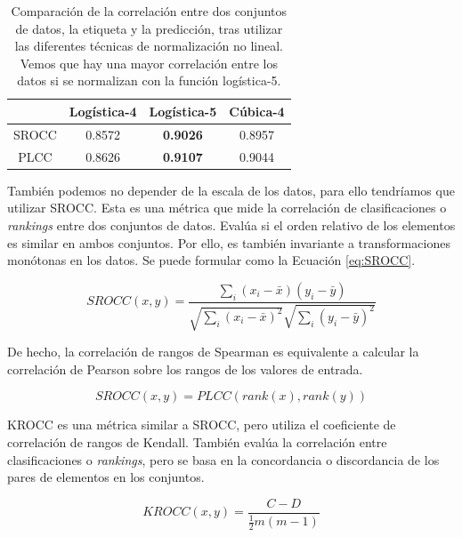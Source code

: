 \begin{table}[htp]
  \centering
  \scriptsize
  \begin{tabular}{|c|c|c|c|}
    \hline
    \rowcolor[HTML]{FFC702} 
    & \textbf{Logística-4} & \textbf{Logística-5} & \textbf{Cúbica-4} \\
    \hline 
    SROCC & 0.8572 & \textbf{0.9026} & 0.8957\\
    \hline
    PLCC & 0.8626 & \textbf{0.9107} & 0.9044 \\
    \hline 
  \end{tabular}
\caption[Comparativa entre funciones de normalización.]{Comparación de la correlación entre dos conjuntos de datos, la etiqueta y 
  la predicción, tras utilizar las diferentes técnicas de normalización no lineal. 
Vemos que hay una mayor correlación entre los datos si se normalizan con la 
función logística-5.}
  \label{tab:CompareNonLineal}
\end{table}
También podemos no depender de la escala de los datos, para ello tendríamos que 
utilizar SROCC.
Esta es una métrica que mide la correlación de clasificaciones o \emph{rankings} entre 
dos conjuntos de datos. Evalúa si el orden relativo de los elementos es similar 
en ambos conjuntos. Por ello, es también invariante a transformaciones monótonas 
en los datos. Se puede formular como la Ecuación \ref{eq:SROCC}.

\begin{equation}
  SROCC(x,y) = \frac{\sum_i (x_i - \bar x)(y_i - \bar y)}{\sqrt{\sum_i (x_i - \bar x)^2}\sqrt{\sum_i (y_i - \bar y)^2}}
\label{eq:SROCC}
\end{equation}

De hecho, la correlación de rangos de Spearman es equivalente a calcular 
la correlación de Pearson sobre los rangos de los valores de entrada.

\begin{equation}
SROCC(x,y) = PLCC(rank(x), rank(y))
\label{eq:SROCCasPLCC}
\end{equation}

KROCC es una métrica similar a SROCC, pero utiliza el coeficiente de correlación 
de rangos de Kendall. También evalúa la correlación entre clasificaciones o \emph{rankings},
pero se basa en la concordancia o discordancia de los pares de elementos en los 
conjuntos.

\begin{equation}
  KROCC(x,y) = \frac{C-D}{\frac{1}{2} m (m-1)}
\label{eq:KROCC}
\end{equation}

